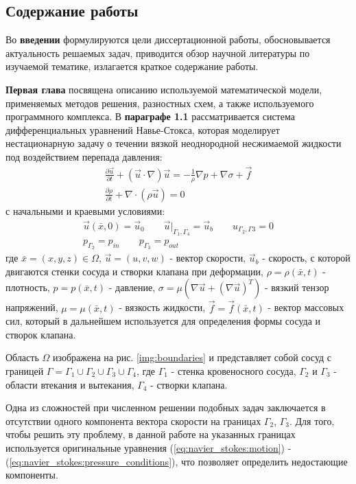 \subsection*{\Large Содержание работы}
Во \textbf{введении} формулируются цели диссертационной работы, 
обосновывается актуальность решаемых задач, приводится обзор научной 
литературы по изучаемой тематике, излагается краткое содержание работы. 

\textbf{Первая глава} посвящена описанию используемой математической модели,
применяемых методов решения, разностных схем, а также используемого
программного комплекса.  В \textbf{параграфе 1.1} рассматривается система
дифференциальных уравнений Навье-Стокса, которая моделирует нестационарную
задачу о течении вязкой неоднородной несжимаемой жидкости под воздействием
перепада давления:
\begin{gather}
    \label{eq:navier_stokes:motion}
    \frac{\partial \vec{u}}{\partial t} + (\vec{u} \cdot \nabla) \vec{u} = - \frac{1}{\rho} \nabla p + \nabla \sigma + \vec{f}\\
    \label{eq:navier_stokes:continuity}
    \frac{\partial \rho}{\partial t} + \nabla \cdot (\rho \vec{u}) = 0 
\end{gather}
с начальными и краевыми условиями:
\begin{gather}
    \label{eq:navier_stokes:velocity_conditions}
    \vec{u}(\bar{x}, 0) = \vec{u}_0 \qquad \vec{u}|_{\Gamma_1, \Gamma_4} = \vec{u}_b \qquad u_{\Gamma_2, \Gamma3} = 0\\
    \label{eq:navier_stokes:pressure_conditions}
    p_{\Gamma_2} = p_{in} \qquad p_{\Gamma_3} = p_{out}
\end{gather}
где $\bar{x}=(x,y,z) \in \Omega$, $\vec{u}=(u,v,w)$ - вектор скорости, $\vec{u}_b$ - скорость, с которой двигаются стенки сосуда и створки клапана при деформации,
$\rho=\rho(\bar{x}, t)$ - плотность, $p=p(\bar{x}, t)$ - давление, $\sigma = \mu (\nabla \vec{u} + (\nabla \vec{u})^T)$ - вязкий тензор напряжений,
$\mu = \mu(\bar{x}, t)$ - вязкость жидкости, $\vec{f} = \vec{f}(\bar{x}, t)$ - вектор массовых сил, который в дальнейшем используется для определения формы сосуда и створок клапана. 

Область $\Omega$ изображена на рис. \ref{img:boundaries} и представляет собой
сосуд с границей $\Gamma = \Gamma_1 \cup \Gamma_2 \cup \Gamma_3 \cup \Gamma_4$,
где $\Gamma_1$ - стенка кровеносного сосуда, $\Gamma_2$ и $\Gamma_3$ -  области
втекания и вытекания, $\Gamma_4$ - створки клапана.

Одна из сложностей при численном решении подобных задач заключается в
отсутствии одного компонента вектора скорости на границах $\Gamma_2$,
$\Gamma_3$. Для того, чтобы решить эту проблему, в данной работе на указанных
границах используется оригинальные уравнения (\ref{eq:navier_stokes:motion}) - 
(\ref{eq:navier_stokes:pressure_conditions}), что позволяет определить недостающие компоненты.

